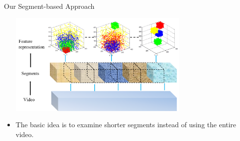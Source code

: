 \documentclass{beamer}
\begin{document}
\begin{frame}[t]{Our Segment-based Approach}
\begin{center}
\includegraphics[width=10cm,height=5cm]{images/segment_based.png}
\end{center}

\begin{itemize}
\item The basic idea is to examine shorter segments instead of using the entire video.

\end{itemize}

\end{frame}
\end{document}
